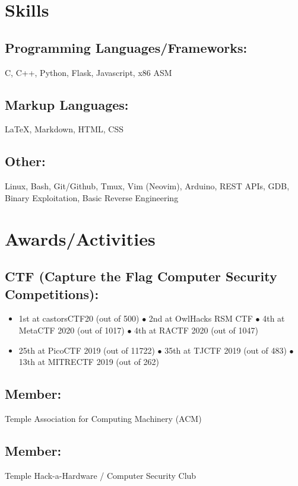 \documentclass{article}
\begin{document}
\section{Skills}
\subsection{Programming Languages/Frameworks:}
C, C++, Python, Flask, Javascript, x86 ASM
\subsection{Markup Languages:}
{\LaTeX}, Markdown, HTML, CSS
\subsection{Other:}
Linux, Bash, Git/Github, Tmux, Vim (Neovim), Arduino, REST APIs, GDB, Binary Exploitation, Basic Reverse Engineering

\section{Awards/Activities}
\subsection{CTF (Capture the Flag Computer Security Competitions):}
\begin{itemize}
    \item 1st at castorsCTF20 (out of 500) $\bullet$ 2nd at OwlHacks RSM CTF $\bullet$ 4th at MetaCTF 2020 (out of 1017) $\bullet$ 4th at RACTF 2020 (out of 1047)
    \item 25th at PicoCTF 2019 (out of 11722) $\bullet$ 35th at TJCTF 2019 (out of 483) $\bullet$ 13th at MITRECTF 2019 (out of 262)
\end{itemize} 
\subsection{Member: } Temple Association for Computing Machinery (ACM)
\subsection{Member: } Temple Hack-a-Hardware / Computer Security Club 
\end{document}

